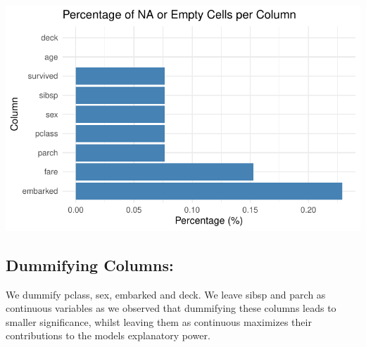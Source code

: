 \documentclass[
  letterpaper,
  DIV=11,
  numbers=noendperiod]{scrartcl}
\begin{document}
\includegraphics{FinalProject_files/figure-pdf/unnamed-chunk-6-1.pdf}

\subsection{Dummifying Columns:}\label{dummifying-columns}

We dummify pclass, sex, embarked and deck. We leave sibsp and parch as
continuous variables as we observed that dummifying these columns leads
to smaller significance, whilst leaving them as continuous maximizes
their contributions to the models explanatory power.
\end{document}

